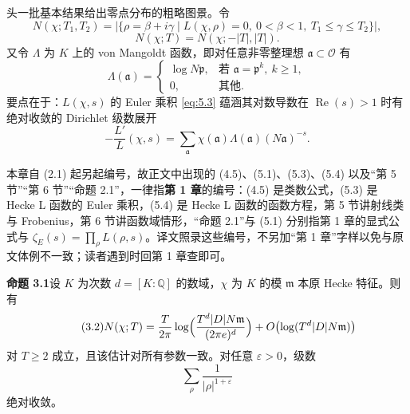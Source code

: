 头一批基本结果给出零点分布的粗略图景。令
\[
N(\chi;T_1,T_2)=\bigl|\{\rho=\beta+i\gamma\mid L(\chi,\rho)=0,\ 0<\beta<1,\ T_1\le\gamma\le T_2\}\bigr|,
\]
\[
N(\chi;T)=N(\chi;-|T|,|T|).
\]
又令 $\Lambda$ 为 $K$ 上的 von Mangoldt 函数，即对任意非零整理想 $\mathfrak{a}\subset\mathcal{O}$ 有
\[
\Lambda(\mathfrak{a})=\begin{cases}\log N\mathfrak{p}, & \text{若 }\mathfrak{a}=\mathfrak{p}^k,\ k\ge1,\\ 0, & \text{其他}.\end{cases}
\]
要点在于：$L(\chi,s)$ 的 Euler 乘积 \eqref{eq:5.3} 蕴涵其对数导数在 $\operatorname{Re}(s)>1$ 时有绝对收敛的 Dirichlet 级数展开
\begin{equation}\tag{3.1}\label{c2:eq:3.1}
-\frac{L'}{L}(\chi,s)=\sum_{\mathfrak{a}}\chi(\mathfrak{a})\Lambda(\mathfrak{a})(N\mathfrak{a})^{-s}.
\end{equation}

\begin{annote}
本章自 (2.1) 起另起编号，故正文中出现的 (4.5)、(5.1)、(5.3)、(5.4) 以及“第 5 节”“第 6 节”“命题 2.1”，一律指\textbf{第 1 章}的编号：(4.5) 是类数公式，(5.3) 是 Hecke L 函数的 Euler 乘积，(5.4) 是 Hecke L 函数的函数方程，第 5 节讲射线类与 Frobenius，第 6 节讲函数域情形，“命题 2.1”与 (5.1) 分别指第 1 章的显式公式与 $\zeta_E(s)=\prod_\rho L(\rho,s)$。译文照录这些编号，不另加“第 1 章”字样以免与原文体例不一致；读者遇到时回第 1 章查即可。
\par\vspace{0.15em}{\raggedleft 【来源：原书第 1 章 (4.5)、(5.1)、(5.3)、(5.4) 与命题 2.1 的逐条编号对照（A）】\par}
\end{annote}

\par\medskip\noindent\textbf{命题 3.1}\quad 设 $K$ 为次数 $d=[K:\mathbb{Q}]$ 的数域，$\chi$ 为 $K$ 的模 $\mathfrak{m}$ 本原 Hecke 特征。则有
\begin{equation}\tag{3.2}\label{c2:eq:3.2}
N(\chi;T)=\frac{T}{2\pi}\log\Bigl(\frac{T^d|D|N\mathfrak{m}}{(2\pi e)^d}\Bigr)+O\bigl(\log(T^d|D|N\mathfrak{m})\bigr)
\end{equation}
对 $T\ge2$ 成立，且该估计对所有参数一致。对任意 $\varepsilon>0$，级数
\begin{equation}\tag{3.3}\label{c2:eq:3.3}
\sum_\rho\frac{1}{|\rho|^{1+\varepsilon}}
\end{equation}
绝对收敛。

